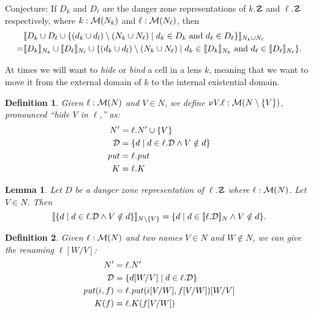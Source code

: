\documentclass{article}
\newtheorem{lemma}{Lemma}
\newtheorem{definition}{Definition}
\begin{document}
Conjecture: If $D_k$ and $D_\ell$ are the danger zone representations of 
    $k.\danger$ and $\ell.\danger$ respectively, where
    $k:\mathcal M(N_k)$ and $\ell:\mathcal M(N_\ell)$, then 
    \begin{align*}
        &\llbracket D_k \cup D_\ell \cup \{(d_k \cup d_l) \setminus (N_k \cup N_\ell) \mid d_k \in D_k \text{ and } d_\ell \in D_\ell\} \rrbracket_{N_k \cup N_\ell} \\
        = &\llbracket D_k \rrbracket_{N_k} \cup \llbracket D_\ell \rrbracket_{N_\ell} \cup 
        \{(d_k \cup d_l) \setminus (N_k \cup N_\ell) \mid d_k \in \llbracket D_k \rrbracket_{N_k} 
                                           \text{ and } d_\ell \in \llbracket D_\ell \rrbracket_{N_\ell}\}.
    \end{align*}

At times we will want to \emph{hide} or \emph{bind} a cell in a lens $k$, 
meaning that we want to move it from the external domain of $k$ to the
internal existential domain.
\begin{definition}
    Given $\ell : \mathcal M(N)$ and $V \in N$, we define $\nu V.\ell : \mathcal M(N
    \setminus \{V\})$, pronounced ``hide $V$ in $\ell$,'' as:
    \begin{align*}
        N' &= \ell.N' \cup \{V\} \\
        \mathcal D &= \{d \mid d \in \ell.\mathcal D \land V \notin d\} \\
        \mathit{put} &= \ell.\mathit{put} \\
        K &= \ell.K
    \end{align*}
\end{definition}

\begin{lemma}
    Let $D$ be a danger zone representation of $\ell.\danger$ where
    $\ell : \mathcal M(N)$. Let $V \in N$. Then 
    \[ \llbracket \{d \mid d \in \ell.\mathcal D \land V \notin d\} \rrbracket_{N\setminus\{V\}}
        = \{ d \mid d \in \llbracket \ell.\mathcal D \rrbracket_{N} \land V \notin d\}. \]
\end{lemma}

\begin{definition}
    Given $\ell : \mathcal M(N)$ and two names $V \in N$ and $W \notin N$, we can
    give the renaming $\ell[W/V]$:
    \begin{align*}
        N' &= \ell.N' \\
        \mathcal D &= \{d[W/V] \mid d \in \ell.\mathcal D\} \\
        \mathit{put}(i,f) &= \ell.\mathit{put}(i[V/W], f[V/W])[W/V] \\
        K(f) &= \ell.K(f[V/W])
    \end{align*}
\end{definition}
\end{document}
